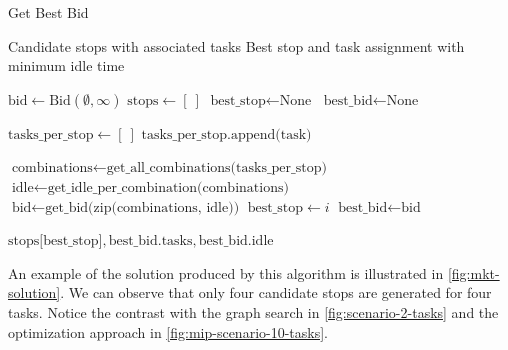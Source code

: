 \begin{algorithm}[H]
    \caption{Get Best Bid}
    \label{alg:get-best-bid}
    \begin{algorithmic}[1]
    \REQUIRE Candidate stops with associated tasks
    \ENSURE Best stop and task assignment with minimum idle time
    
    \STATE $\text{bid} \gets \text{Bid}(\emptyset, \infty)$
    \STATE $\text{stops} \gets [\ ]$
    \STATE $\text{best\_stop} \gets \text{None}$
    \STATE $\text{best\_bid} \gets \text{None}$
    
        \STATE $\text{tasks\_per\_stop} \gets [\ ]$
            \STATE $\text{tasks\_per\_stop.append(task)}$
        \ENDFOR
    
        \STATE $\text{combinations} \gets \text{get\_all\_combinations(tasks\_per\_stop)}$
        \STATE $\text{idle} \gets \text{get\_idle\_per\_combination(combinations)}$
        \STATE $\text{bid} \gets \text{get\_bid(zip(combinations, idle))}$
            \STATE $\text{best\_stop} \gets i$
            \STATE $\text{best\_bid} \gets \text{bid}$
        \ENDIF
    \ENDFOR
    
    \RETURN $\text{stops[best\_stop]}, \text{best\_bid.tasks}, \text{best\_bid.idle}$
    \end{algorithmic}
\end{algorithm}
    

An example of the solution produced by this algorithm is illustrated in \autoref{fig:mkt-solution}. We can observe that only four candidate stops are generated for four tasks. Notice the contrast with the graph search in \autoref{fig:scenario-2-tasks} and the optimization approach in \autoref{fig:mip-scenario-10-tasks}.

